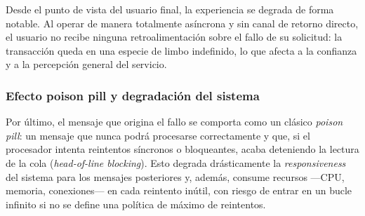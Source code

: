 Desde el punto de vista del usuario final, la experiencia se degrada de forma
notable. Al operar de manera totalmente asíncrona y sin canal de retorno directo, el
usuario no recibe ninguna retroalimentación sobre el fallo de su solicitud: la
transacción queda en una especie de limbo indefinido, lo que afecta a la confianza
y a la percepción general del servicio.

\subsubsection{Efecto poison pill y degradación del sistema}

Por último, el mensaje que origina el fallo se comporta como un clásico
\emph{poison pill}: un mensaje que nunca podrá procesarse correctamente y que, si el
procesador intenta reintentos síncronos o bloqueantes, acaba deteniendo la lectura
de la cola (\emph{head-of-line blocking}). Esto degrada drásticamente la
\emph{responsiveness} del sistema para los mensajes posteriores y, además, consume
recursos ---CPU, memoria, conexiones--- en cada reintento inútil, con riesgo de
entrar en un bucle infinito si no se define una política de máximo de reintentos.
